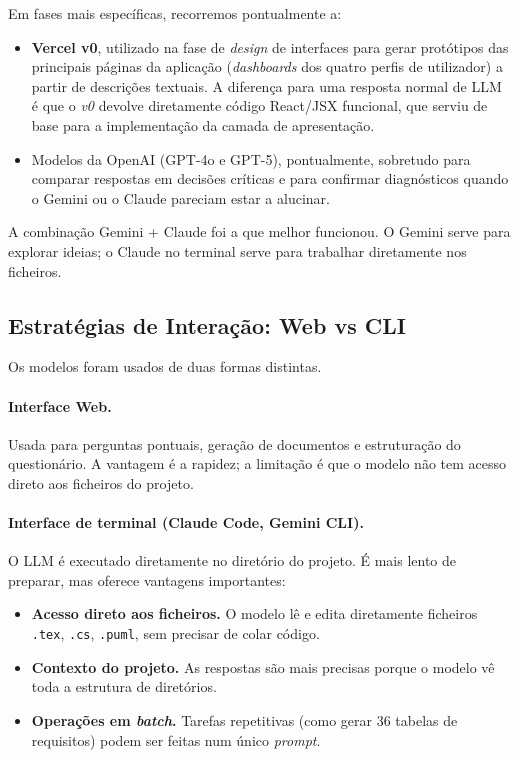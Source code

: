 Em fases mais específicas, recorremos pontualmente a:

\begin{itemize}
    \item \textbf{Vercel v0}, utilizado na fase de \textit{design} de interfaces para gerar protótipos das principais páginas da aplicação (\textit{dashboards} dos quatro perfis de utilizador) a partir de descrições textuais. A diferença para uma resposta normal de LLM é que o \textit{v0} devolve diretamente código React/JSX funcional, que serviu de base para a implementação da camada de apresentação.

    \item Modelos da OpenAI (GPT-4o e GPT-5), pontualmente, sobretudo para comparar respostas em decisões críticas e para confirmar diagnósticos quando o Gemini ou o Claude pareciam estar a alucinar.
\end{itemize}

A combinação Gemini + Claude foi a que melhor funcionou. O Gemini serve para explorar ideias; o Claude no terminal serve para trabalhar diretamente nos ficheiros.

\subsection{Estratégias de Interação: Web vs CLI}

Os modelos foram usados de duas formas distintas.

\paragraph{Interface Web.}
Usada para perguntas pontuais, geração de documentos e estruturação do questionário. A vantagem é a rapidez; a limitação é que o modelo não tem acesso direto aos ficheiros do projeto.

\paragraph{Interface de terminal (Claude Code, Gemini CLI).}
O LLM é executado diretamente no diretório do projeto. É mais lento de preparar, mas oferece vantagens importantes:

\begin{itemize}
    \item \textbf{Acesso direto aos ficheiros.} O modelo lê e edita diretamente ficheiros \texttt{.tex}, \texttt{.cs}, \texttt{.puml}, sem precisar de colar código.
    \item \textbf{Contexto do projeto.} As respostas são mais precisas porque o modelo vê toda a estrutura de diretórios.
    \item \textbf{Operações em \textit{batch}.} Tarefas repetitivas (como gerar 36 tabelas de requisitos) podem ser feitas num único \textit{prompt}.
\end{itemize}

